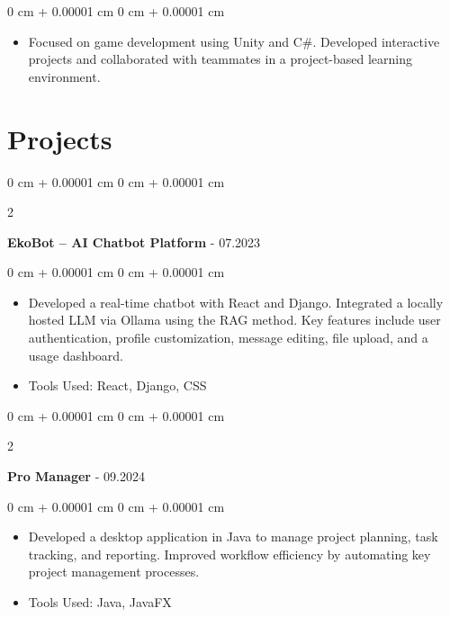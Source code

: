 \documentclass[10pt, letterpaper]{article}
\newenvironment{highlights}{
    \begin{itemize}[
        topsep=0.10 cm,
        parsep=0.10 cm,
        partopsep=0pt,
        itemsep=0pt,
        leftmargin=0 cm + 10pt
    ]
}{
    \end{itemize}
} %
\newenvironment{onecolentry}{
    \begin{adjustwidth}{
        0 cm + 0.00001 cm
    }{
        0 cm + 0.00001 cm
    }
}{
    \end{adjustwidth}
} %
\newenvironment{twocolentry}[2][]{
    \onecolentry
    \def\secondColumn{#2}
    \setcolumnwidth{\fill, 4.5 cm}
    \begin{paracol}{2}
}{
    \switchcolumn \raggedleft \secondColumn
    \end{paracol}
    \endonecolentry
} %
\begin{document}
    \vspace{0.10 cm}
    \begin{onecolentry}
        \begin{highlights}
            \item Focused on game development using Unity and C#. Developed interactive projects and collaborated with teammates in a project-based learning environment.
        \end{highlights}
    \end{onecolentry}


    \section{Projects}

    \begin{twocolentry}{
        11.2022 - 07.2023
    }
        \textbf{EkoBot – AI Chatbot Platform}\end{twocolentry}

    \vspace{0.10 cm}
    \begin{onecolentry}
        \begin{highlights}
            \item Developed a real-time chatbot with React and Django. Integrated a locally hosted LLM via Ollama using the RAG method. Key features include user authentication, profile customization, message editing, file upload, and a usage dashboard.
            \item Tools Used: React, Django, CSS
        \end{highlights}
    \end{onecolentry}

    \vspace{0.2 cm}

    \begin{twocolentry}{
        06.2024 - 09.2024
    }
        \textbf{Pro Manager}\end{twocolentry}

    \vspace{0.10 cm}
    \begin{onecolentry}
        \begin{highlights}
            \item Developed a desktop application in Java to manage project planning, task tracking, and reporting. Improved workflow efficiency by automating key project management processes.
            \item Tools Used: Java, JavaFX
        \end{highlights}
    \end{onecolentry}
\end{document}

